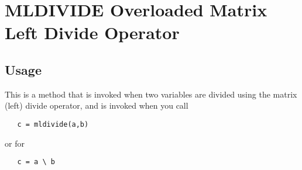 \section{MLDIVIDE Overloaded Matrix Left Divide Operator}

\subsection{Usage}

This is a method that is invoked when two variables are divided
using the matrix (left) divide operator, and is invoked when
you call
\begin{verbatim}
   c = mldivide(a,b)
\end{verbatim}
or for
\begin{verbatim}
   c = a \ b
\end{verbatim}
